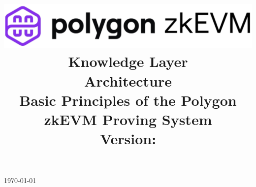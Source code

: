 \documentclass[preprint]{iacrtrans}
\title{
  \includegraphics[width=\columnwidth]{logo_zkEVM.png} \\ \vspace{0.3cm}
  Knowledge Layer \vspace{0.3cm}\\
  Architecture \vspace{0.3cm}\\
  Basic Principles of the Polygon zkEVM Proving System \vspace{0.3cm}\\
  \normalsize
  Version: \commithash
}
\institute{}
\theoremstyle{definition}
\begin{document}
\begin{titlepage}
\centering
\maketitle
\today
\end{titlepage}



\newpage









%
%

\newpage
\appendix
\end{document}

